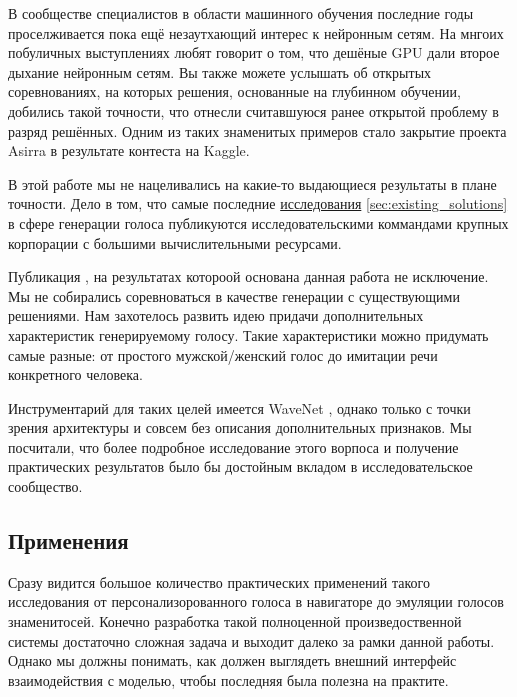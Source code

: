 \documentclass[../diploma.tex]{subfiles}
\begin{document}
В сообществе специалистов в области машинного обучения последние годы проселживается пока ещё незаутхающий интерес к нейронным сетям. 
На мнгоих побуличных выступлениях любят говорит о том, что дешёные GPU дали второе дыхание нейронным сетям. 
Вы также можете услышать об открытых соревнованиях, на которых решения, основанные на глубинном обучении, добились такой точности, что отнесли считавшуюся ранее открытой проблему в разряд решённых.
Одним из таких знаменитых примеров стало закрытие проекта Asirra\cite{elson2007asirra} в результате контеста на Kaggle\cite{kaggle:dogcats}. 

В этой работе мы не нацеливались на какие-то выдающиеся результаты в плане точности.
Дело в том, что самые последние \hyperref[sec:existing_solutions]{исследования} \autoref{sec:existing_solutions} в сфере генерации голоса публикуются исследовательскими коммандами крупных корпорации с большими вычислительными ресурсами. 

Публикация \cite{article:van2016wavenet}, на результатах котороой основана данная работа  не исключение.
Мы не собирались соревноваться в качестве генерации с существующими решениями. Нам захотелось развить идею придачи дополнительных характеристик генерируемому голосу. Такие характеристики можно придумать самые разные: от простого мужской/женский голос до имитации речи конкретного человека.


Инструментарий для таких целей имеется WaveNet \cite{article:van2016wavenet}, однако только с точки зрения архитектуры и совсем без описания дополнительных признаков. Мы посчитали, что более подробное исследование этого ворпоса и получение практических результатов было бы достойным вкладом в исследовательское сообщество.

\subsection{Применения}

Сразу видится большое количество практических применений такого исследования от персонализорованного голоса в навигаторе до эмуляции голосов знаменитосей. Конечно разработка такой полноценной произведоственной системы достаточно сложная задача и выходит далеко за рамки данной работы. Однако мы должны понимать, как должен выглядеть внешний интерфейс взаимодействия с моделью, чтобы последняя была полезна на практите. 
\end{document}
